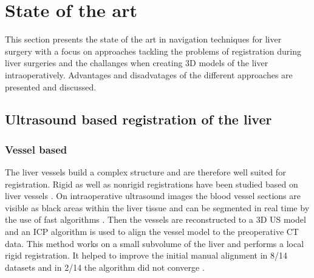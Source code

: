 \chapter{State of the art}
This section presents the state of the art in navigation techniques for liver
surgery with a focus on approaches tackling the problems of registration during
liver surgeries and the challanges when creating 3D models of the liver
intraoperatively. Advantages and disadvatages of the different approaches are
presented and discussed.
\section{Ultrasound based registration of the liver}
\label{sec:ultrasoundBasedRegistration}


\subsection{Vessel based}
The liver vessels build a complex structure and are
therefore well suited for registration. Rigid as well as nonrigid registrations
have been studied based on liver vessels \cite{ribes2012image}\cite{lange20093d}. 
On intraoperative ultrasound images the
blood vessel sections are visible as black areas within the liver tissue and can
be segmented in real time by the use of fast algorithms \cite{ribes2012image}. Then the
vessels are 
reconstructed to a 3D US model and an ICP algorithm is used to align the vessel model to
the preoperative CT data. This method works on a small subvolume of the liver
and performs a local rigid registration. It helped to improve the
initial manual alignment in 8/14 datasets and in 2/14 the algorithm did not
converge \cite{ribes2012image}.



